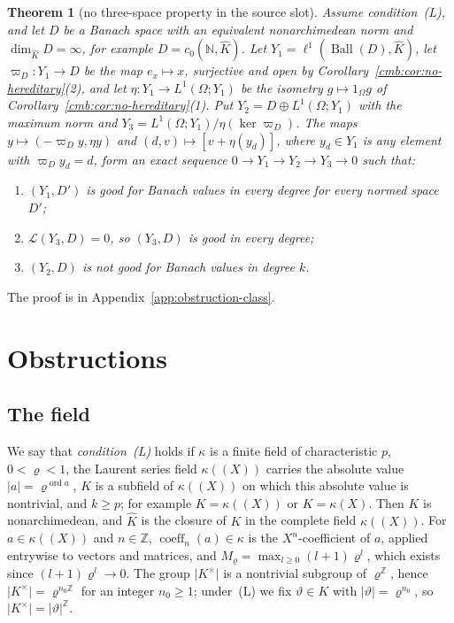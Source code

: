 \documentclass[11pt]{amsart}
\newtheorem{theorem}{Theorem}[section]
\theoremstyle{definition}
\theoremstyle{remark}
\numberwithin{equation}{section}
\newcommand{\N}{\mathbb N}
\newcommand{\Z}{\mathbb Z}
\newcommand{\cL}{\mathcal L}
\newcommand{\abs}[1]{\lvert #1\rvert}
\newcommand{\coeff}{\operatorname{coeff}}
\newcommand{\ord}{\operatorname{ord}}
\newcommand{\Kh}{\widehat K}
\theoremstyle{plain}
\theoremstyle{definition}
\theoremstyle{plain}
\begin{document}
\begin{theorem}[no three-space property in the source slot]\label{cmb:thm:three-space}
Assume condition~\textup{(L)}, and let $D$ be a Banach space with an equivalent nonarchimedean norm and $\dim_{\Kh}D=\infty$,
for example $D=c_0(\N,\Kh)$. Let $Y_1=\ell^1(\operatorname{Ball}(D),\Kh)$, let $\varpi_D\colon Y_1\to D$ be the map
$e_x\mapsto x$, surjective and open by Corollary~\ref{cmb:cor:no-hereditary}(2), and let
$\eta\colon Y_1\to L^1(\Omega;Y_1)$ be the isometry $g\mapsto1_\Omega g$ of Corollary~\ref{cmb:cor:no-hereditary}(1). Put
$Y_2=D\oplus L^1(\Omega;Y_1)$ with the maximum norm and $Y_3=L^1(\Omega;Y_1)/\eta(\ker\varpi_D)$. The maps
$y\mapsto(-\varpi_Dy,\eta y)$ and $(d,v)\mapsto[v+\eta(y_d)]$, where $y_d\in Y_1$
is any element with $\varpi_Dy_d=d$, form an exact sequence $0\to Y_1\to Y_2\to Y_3\to0$ such that:
\begin{enumerate}
\item $(Y_1,D')$ is good for Banach values in every degree for every normed space $D'$;
\item $\cL(Y_3,D)=0$, so $(Y_3,D)$ is good in every degree;
\item $(Y_2,D)$ is not good for Banach values in degree $k$.
\end{enumerate}
\end{theorem}

The proof is in Appendix~\ref{app:obstruction-class}.
\section{Obstructions}\label{sec:sharpness}

\subsection{The field}\label{obs:ssec:field}
We say that \emph{condition~\textup{(L)}} holds if $\kappa$ is a finite field of characteristic $p$, $0<\varrho<1$, the
Laurent series field $\kappa((X))$ carries the absolute value $\abs a=\varrho^{\ord a}$, $K$ is a subfield of
$\kappa((X))$ on which this absolute value is nontrivial, and $k\ge p$; for example $K=\kappa((X))$ or $K=\kappa(X)$.
Then $K$ is nonarchimedean, and $\Kh$ is the closure of $K$ in the complete field $\kappa((X))$. For $a\in\kappa((X))$
and $n\in\Z$, $\coeff_n(a)\in\kappa$ is the $X^n$\nobreakdash-coefficient of $a$, applied entrywise to vectors and
matrices, and $M_\varrho=\max_{l\ge0}(l+1)\varrho^l$, which exists since $(l+1)\varrho^l\to0$. The group
$\abs{K^\times}$ is a nontrivial subgroup of $\varrho^\Z$, hence $\abs{K^\times}=\varrho^{n_0\Z}$ for an integer
$n_0\ge1$; under~\textup{(L)} we fix $\vartheta\in K$ with $\abs\vartheta=\varrho^{n_0}$, so $\abs{K^\times}=\abs\vartheta^\Z$.
\end{document}
